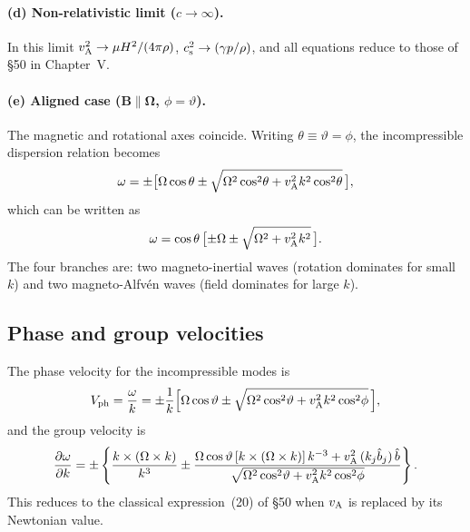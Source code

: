 \paragraph{(d) Non-relativistic limit ($c\to\infty$).}
In this limit $v_{\mathrm{A}}^{2}\to\mu H^{2}/(4\pi\rho)$, $c_{\mathrm{s}}^{2}\to(\gamma
p/\rho)$, and all equations reduce to those of \S50 in Chapter~V.

\paragraph{(e) Aligned case ($\mathbf{B}\parallel\boldsymbol{\Omega}$,
$\phi=\vartheta$).}
The magnetic and rotational axes coincide.  Writing
$\theta\equiv\vartheta=\phi$, the incompressible dispersion relation
becomes
\begin{equation}
  \omega = \pm\bigl[\Omega\cos\theta
    \pm\sqrt{\Omega^{2}\cos^{2}\!\theta + v_{\mathrm{A}}^{2}k^{2}\cos^{2}\!\theta}
    \,\bigr],
\end{equation}
which can be written as
\begin{equation}
  \omega = \cos\theta\,\bigl[\pm\Omega
    \pm\sqrt{\Omega^{2}+v_{\mathrm{A}}^{2}k^{2}}\,\bigr].
  \label{eq:rel50-aligned}
\end{equation}
The four branches are: two magneto-inertial waves (rotation dominates for
small $k$) and two magneto-Alfv\'en waves (field dominates for large $k$).

\subsection{Phase and group velocities}

The phase velocity for the incompressible modes is
\begin{equation}
  V_{\text{ph}} = \frac{\omega}{k}
    = \pm\frac{1}{k}\Bigl[\Omega\cos\vartheta
      \pm\sqrt{\Omega^{2}\cos^{2}\!\vartheta
        + v_{\mathrm{A}}^{2}k^{2}\cos^{2}\!\phi}\,\Bigr],
  \label{eq:rel50-phase}
\end{equation}
and the group velocity is
\begin{equation}
  \frac{\partial\omega}{\partial\mathbf{k}}
    = \pm\left\{
      \frac{\mathbf{k}\times(\boldsymbol{\Omega}\times\mathbf{k})}{k^{3}}
      \pm\frac{\Omega\cos\vartheta\,
        [\mathbf{k}\times(\boldsymbol{\Omega}\times\mathbf{k})]\,k^{-3}
        + \vA^{2}\,(k_{j}\hat{b}_{j})\,\hat{\mathbf{b}}}%
      {\sqrt{\Omega^{2}\cos^{2}\!\vartheta
        + \vA^{2}k^{2}\cos^{2}\!\phi}}
    \right\}.
  \label{eq:rel50-group}
\end{equation}
This reduces to the classical expression~(20) of \S50 when
$v_{\mathrm{A}}$ is replaced by its Newtonian value.

